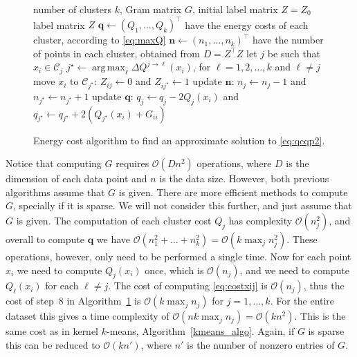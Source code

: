 \documentclass[aps,preprint,nofootinbib,floatfix]{revtex4-1}
\DeclareMathOperator*{\argmax}{arg\,max}
\newcommand\C{{\mathcal{C}}}
\newcommand\OO{{\mathcal{O}}}
\begin{document}
\begin{figure}
\begin{algorithm}[H]
\vspace{.5em}
\begin{algorithmic}[1]
    \INPUT number of clusters $k$, Gram matrix $G$, 
                initial label matrix $Z=Z_0$
    \OUTPUT label matrix $Z$
  \STATE $\bm{q} \leftarrow (Q_1, \dotsc, Q_k)^\top$ 
            have the energy costs of each cluster, according to \eqref{eq:maxQ}
  \STATE $\bm{n} \leftarrow (n_1,\dotsc,n_k)^\top$ have the number of points 
        in each cluster, obtained from $D=Z^\top Z$
  \REPEAT
        \STATE let $j$ be such that $x_i \in \C_j$
        \STATE $j^\star \leftarrow \argmax_{\ell} \Delta Q^{j\to \ell}(x_i)$, 
            for $\ell=1,2,\dots,k$ and $\ell \ne j$ \label{stepmove}
            \STATE move $x_i$ to $\C_{j^\star}$: $Z_{ij} \leftarrow 0$ and 
            $Z_{ij^\star} \leftarrow 1$
            \STATE update $\bm{n}$: $n_j \leftarrow n_j - 1$ and
                    $n_{j^\star} \leftarrow n_{j^\star} + 1$
            \STATE update $\bm{q}$: $q_j \leftarrow q_j - 2Q_j(x_i)$ and
    $q_{j^\star} \leftarrow q_{j^\star} + 2\left(Q_{j^\star}(x_i)+
    G_{ii}\right)$
        \ENDIF
    \ENDFOR
\end{algorithmic}
\caption{\label{algo}
Energy cost algorithm to find an approximate solution to \eqref{eq:qcqp2}.
\hspace{\fill}
}
\end{algorithm}
\end{figure}

Notice that computing $G$ requires $\OO( D n^2)$ operations, where 
$D$ is the dimension of each data point and $n$ is the data size. However,
both previous algorithms assume that $G$ is given. There are more efficient
methods to compute $G$, specially if it is sparse. We will not consider
this further, and just assume that $G$ is given.
The computation of each cluster cost
$Q_j$ has complexity $\OO(n_j^2)$, and overall to compute $\bm{q}$
we have $\OO(n_1^2+\dots + n_k^2) = \OO(k \max_j n_j^2)$. 
These operations, however, only need to be performed a single time. Now for
each point $x_i$ we need to compute $Q_j(x_i)$ once, which is
$\OO(n_j)$, and we need to compute $Q_\ell(x_i)$ for each $\ell\ne j$. 
The cost of computing 
\eqref{eq:costxij} is $\OO(n_j)$, thus the cost of step~$8$ in
Algorithm~\ref{algo} is $\OO(k \max_j n_j)$ for $j=1,\dotsc,k$.
For the 
entire dataset this gives a time complexity
of $\OO(n k  \max_j n_j) =\OO(k n^2)$. This is the same cost as
in kernel $k$-means, Algorithm~\ref{kmeans_algo}. Again, if $G$ is sparse
this can be reduced to $\OO(k n')$, where $n'$ is the number of nonzero
entries of $G$.
\end{document}

